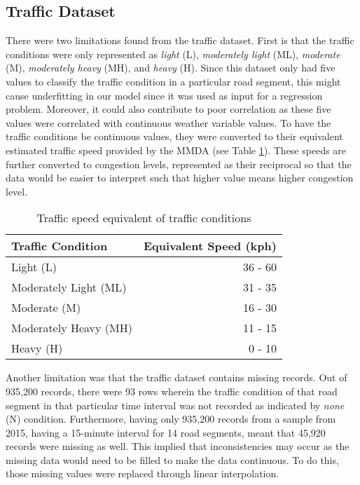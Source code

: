 \subsection{Traffic Dataset}
There were two limitations found from the traffic dataset. First is that the traffic conditions were only represented as \textit{light} (L), \textit{moderately light} (ML), \textit{moderate} (M), \textit{moderately heavy} (MH), and \textit{heavy} (H). Since this dataset only had five values to classify the traffic condition in a particular road segment, this might cause underfitting in our model since it was used as input for a regression problem. Moreover, it could also contribute to poor correlation as these five values were correlated with continuous weather variable values. To have the traffic conditions be continuous values, they were converted to their equivalent estimated traffic speed provided by the MMDA (see Table \ref{table_traffic_condition}). These speeds are further converted to congestion levels, represented as their reciprocal so that the data would be easier to interpret such that higher value means higher congestion level.

\begin{table}[h]
\centering
\caption{Traffic speed equivalent of traffic conditions}
\label{table_traffic_condition}
\begin{tabular}{|l|r|}
\hline
\textbf{Traffic Condition} & \multicolumn{1}{l|}{\textbf{Equivalent Speed (kph)}} \\ \hline
Light (L)                  & 36 - 60                                             \\ \hline
Moderately Light (ML)                  & 31 - 35                                            \\ \hline
Moderate (M)               & 16 - 30                                             \\ \hline
Moderately Heavy (MH)                  & 11 - 15                                             \\ \hline
Heavy (H)                  & 0 - 10                                              \\ \hline
\end{tabular}
\end{table}

Another limitation was that the traffic dataset contains missing records. Out of 935,200 records, there were 93 rows wherein the traffic condition of that road segment in that particular time interval was not recorded as indicated by \textit{none} (N) condition. Furthermore, having only 935,200 records from a sample from 2015, having a 15-minute interval for 14 road segments, meant that 45,920 records were missing as well. This implied that inconsistencies may occur as the missing data would need to be filled to make the data continuous. To do this, those missing values were replaced through linear interpolation.

